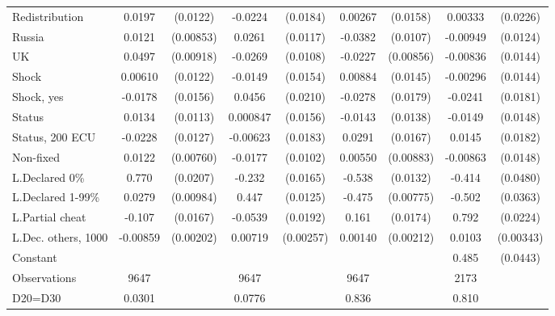\begin{tabular}{l|cccccc|cc}
Redistribution&   0.0197         & (0.0122)&  -0.0224         & (0.0184)&  0.00267         & (0.0158)&  0.00333         & (0.0226)\\
Russia        &   0.0121         &(0.00853)&   0.0261\sym{**} & (0.0117)&  -0.0382\sym{***}& (0.0107)& -0.00949         & (0.0124)\\
UK            &   0.0497\sym{***}&(0.00918)&  -0.0269\sym{**} & (0.0108)&  -0.0227\sym{***}&(0.00856)& -0.00836         & (0.0144)\\
Shock         &  0.00610         & (0.0122)&  -0.0149         & (0.0154)&  0.00884         & (0.0145)& -0.00296         & (0.0144)\\
Shock, yes    &  -0.0178         & (0.0156)&   0.0456\sym{**} & (0.0210)&  -0.0278         & (0.0179)&  -0.0241         & (0.0181)\\
Status        &   0.0134         & (0.0113)& 0.000847         & (0.0156)&  -0.0143         & (0.0138)&  -0.0149         & (0.0148)\\
Status, 200 ECU&  -0.0228\sym{*}  & (0.0127)& -0.00623         & (0.0183)&   0.0291\sym{*}  & (0.0167)&   0.0145         & (0.0182)\\
Non-fixed     &   0.0122         &(0.00760)&  -0.0177\sym{*}  & (0.0102)&  0.00550         &(0.00883)& -0.00863         & (0.0148)\\
L.Declared 0\%&    0.770\sym{***}& (0.0207)&   -0.232\sym{***}& (0.0165)&   -0.538\sym{***}& (0.0132)&   -0.414\sym{***}& (0.0480)\\
L.Declared 1-99\%&   0.0279\sym{***}&(0.00984)&    0.447\sym{***}& (0.0125)&   -0.475\sym{***}&(0.00775)&   -0.502\sym{***}& (0.0363)\\
L.Partial cheat &   -0.107\sym{***}& (0.0167)&  -0.0539\sym{***}& (0.0192)&    0.161\sym{***}& (0.0174)&    0.792\sym{***}& (0.0224)\\
L.Dec. others, 1000& -0.00859\sym{***}&(0.00202)&  0.00719\sym{***}&(0.00257)&  0.00140         &(0.00212)&   0.0103\sym{***}&(0.00343)\\
Constant        &                  &         &                  &         &                  &         &    0.485\sym{***}& (0.0443)\\
\hline
Observations    &     9647         &         &     9647         &         &     9647         &         &     2173         &         \\
D20=D30         &   0.0301         &         &   0.0776         &         &    0.836         &         &    0.810         &         \\

\end{tabular}
